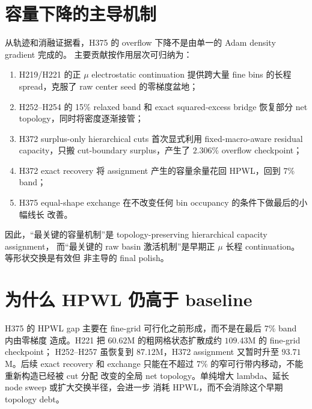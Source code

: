 \documentclass[UTF8,a4paper,11pt]{ctexrep}
\begin{document}
\section{容量下降的主导机制}
从轨迹和消融证据看，H375 的 overflow 下降不是由单一的 Adam density gradient 完成的。
主要贡献按作用层次可归纳为：
\begin{enumerate}
  \item H219/H221 的正 $\mu$ electrostatic continuation 提供跨大量 fine bins 的长程
        spread，克服了 raw center seed 的零梯度盆地；
  \item H252--H254 的 15\% relaxed band 和 exact squared-excess bridge 恢复部分 net
        topology，同时将密度逐渐接管；
  \item H372 surplus-only hierarchical cuts 首次显式利用 fixed-macro-aware residual
        capacity，只搬 cut-boundary surplus，产生了 $2.306\%$ overflow checkpoint；
  \item H372 exact recovery 将 assignment 产生的容量余量花回 HPWL，回到 7\% band；
  \item H375 equal-shape exchange 在不改变任何 bin occupancy 的条件下做最后的小幅线长
        改善。
\end{enumerate}
因此，“最关键的容量机制”是 topology-preserving hierarchical capacity assignment，
而“最关键的 raw basin 激活机制”是早期正 $\mu$ 长程 continuation。等形状交换是有效但
非主导的 final polish。

\section{为什么 HPWL 仍高于 baseline}
H375 的 HPWL gap 主要在 fine-grid 可行化之前形成，而不是在最后 7\% band 内由零梯度
造成。H221 把 $60.62$M 的粗网格状态扩散成约 $109.43$M 的 fine-grid checkpoint；
H252--H257 虽恢复到 $87.12$M，H372 assignment 又暂时升至 $93.71$M。后续 exact
recovery 和 exchange 只能在不超过 7\% 的窄可行带内移动，不能重新构造已经被 cut 分配
改变的全局 net topology。单纯增大 lambda、延长 node sweep 或扩大交换半径，会进一步
消耗 HPWL，而不会消除这个早期 topology debt。
\end{document}
